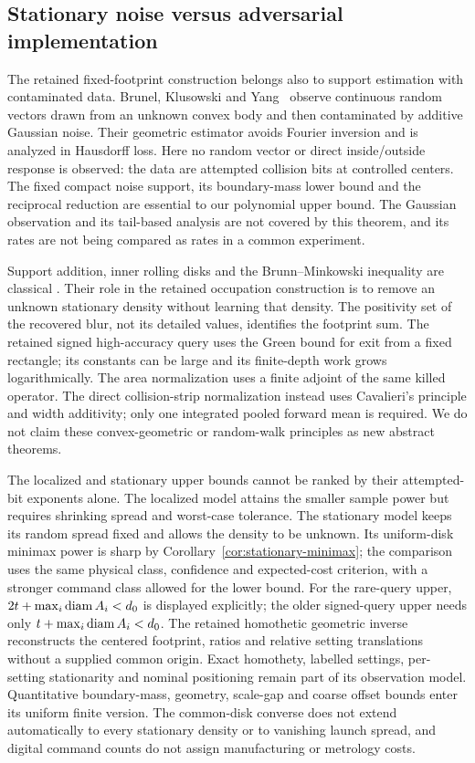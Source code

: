 \subsection{Stationary noise versus adversarial implementation}
The retained fixed-footprint construction belongs also to support estimation with
contaminated data. Brunel, Klusowski and Yang~\cite{BKY} observe
continuous random vectors drawn from an unknown convex body and then
contaminated by additive Gaussian noise. Their geometric estimator
avoids Fourier inversion and is analyzed in Hausdorff loss. Here no
random vector or direct inside/outside response is observed: the data
are attempted collision bits at controlled centers. The fixed compact
noise support, its boundary-mass lower bound and the reciprocal reduction
are essential to our polynomial upper bound. The Gaussian observation
and its tail-based analysis are not covered by this theorem, and its
rates are not being compared as rates in a common experiment.

Support addition, inner rolling disks and the Brunn--Minkowski inequality
are classical \cite{Schneider}. Their role in the retained occupation construction is to remove an
unknown stationary density without learning that density. The positivity set of
the recovered blur, not its detailed values, identifies the footprint
sum. The retained signed high-accuracy query uses the Green bound for exit from a fixed
rectangle; its constants can be large and its finite-depth work grows
logarithmically. The area normalization uses a finite adjoint of the
same killed operator. The direct collision-strip normalization instead
uses Cavalieri's principle and width additivity; only one integrated
pooled forward mean is required. We do not claim these convex-geometric
or random-walk
principles as new abstract theorems.

The localized and stationary upper bounds cannot be ranked by their
attempted-bit exponents alone. The localized model attains the smaller
sample power but requires shrinking spread and worst-case tolerance.
The stationary model keeps its random spread fixed and allows the
density to be unknown. Its uniform-disk minimax power is sharp by
Corollary~\ref{cor:stationary-minimax}; the comparison uses the same
physical class, confidence and expected-cost criterion, with a
stronger command class allowed for the lower bound. For the rare-query
upper, $2t+\max_i\operatorname{diam} A_i<d_0$ is displayed explicitly; the older
signed-query upper needs only $t+\max_i\operatorname{diam} A_i<d_0$.
The retained homothetic geometric inverse reconstructs the centered footprint,
ratios and relative setting translations without a supplied common
origin. Exact homothety, labelled settings, per-setting stationarity
and nominal positioning remain part of its observation model.
Quantitative boundary-mass, geometry, scale-gap and coarse offset
bounds enter its uniform finite version. The common-disk converse
does not extend automatically to every stationary density or to
vanishing launch spread, and digital command counts do not assign
manufacturing or metrology costs.
